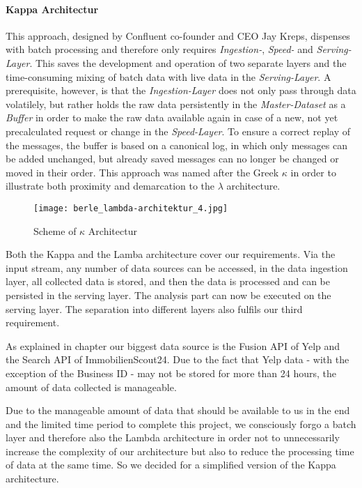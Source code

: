 \paragraph{Kappa Architectur}
This approach, designed by Confluent co-founder and CEO Jay Kreps, dispenses with batch processing and therefore only requires
\textit{Ingestion-}, \textit{Speed-} and \textit{Serving-Layer}.
This saves the development and operation of two separate layers and the time-consuming mixing of batch data with live data in the \textit{Serving-Layer}.
A prerequisite, however, is that the \textit{Ingestion-Layer} does not only pass through data volatilely,
but rather holds the raw data persistently in the \textit{Master-Dataset} as a \textit{Buffer} in order to make the raw data available again in case of a new,
not yet precalculated request or change in the \textit{Speed-Layer}.
To ensure a correct replay of the messages, the buffer is based on a canonical log, in which only messages can be added unchanged, but already saved messages can no
longer be changed or moved in their order.
This approach was named after the Greek $\kappa$ in order to illustrate both proximity and demarcation to the $\lambda$ architecture.
\cite{Kappa} \cite{Kappa2}
\begin{figure}[h]
	\centering
	\texttt{[image: berle\_lambda-architektur\_4.jpg]}
	\caption[Scheme of $\kappa$ Architectur]{Scheme of $\kappa$ Architectur\cite{jaxkappa}}
	\label{fig:KappaArchitecture}
\end{figure}
Both the Kappa and the Lamba architecture cover our requirements.
Via the input stream, any number of data sources can be accessed, in the
data ingestion layer, all collected data is stored, and then the data is processed and can be persisted in the serving layer.
The analysis part can now be executed on the serving layer.
The separation into different layers also fulfils our third requirement.

As explained in chapter  our biggest data source is the Fusion \ac{API} of Yelp and
the Search \ac{API} of ImmobilienScout24.
Due to the fact that Yelp data - with the exception of the Business ID - may not be stored for more than 24 hours,\cite{YelpFaq}
the amount of data collected is manageable.

Due to the manageable amount of data that should be available to us in the end and the limited time period to complete this project,
we consciously forgo a batch layer and therefore also the Lambda architecture
in order not to unnecessarily increase the complexity of our architecture but also to reduce the processing time of data at the same time.
So we decided for a simplified version of the Kappa architecture.

